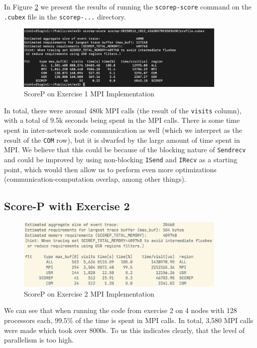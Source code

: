 \documentclass[a4paper,10pt]{article}
\begin{document}
In Figure \ref{fig:ex3_ex1_scorep} we present the results of running the \verb|scorep-score| command on the \verb|.cubex| file in the \verb|scorep-...| directory. 

\begin{figure}[H]
  \centering
  \includegraphics[width=0.9\textwidth]{img/ex3/ex1_scorep.png}
  \caption{ScoreP on Exercise 1 MPI Implementation}
  \label{fig:ex3_ex1_scorep}
\end{figure}

In total, there were around 480k MPI calls (the result of the \verb|visits| column), with a total of 9.5k seconds being spent in the MPI calls. There is some time spent in inter-network node communication as well (which we interpret as the result of the \verb|COM| row), but it is dwarfed by the large amount of time spent in MPI. We believe that this could be because of the blocking nature of \verb|Sendrecv| and could be improved by using non-blocking \verb|ISend| and \verb|IRecv| as a starting point, which would then allow us to perform even more optimizations (communication-computation overlap, among other things).

\subsection{Score-P with Exercise 2}
\label{sec:ex3_ex2}
\begin{figure}[H]
  \centering
  \includegraphics[width=0.9\textwidth]{img/ex3/ex2_scorep.png}
  \caption{ScoreP on Exercise 2 MPI Implementation}
  \label{fig:ex3_ex1_scorep}
\end{figure}

We can see that when running the code from exercise 2 on 4 nodes with 128 processors each, 99.5\% of the time is spent in MPI calls.
In total, 3,580 MPI calls were made which took over 8000s.
To us this indicates clearly, that the level of parallelism is too high.
\end{document}
